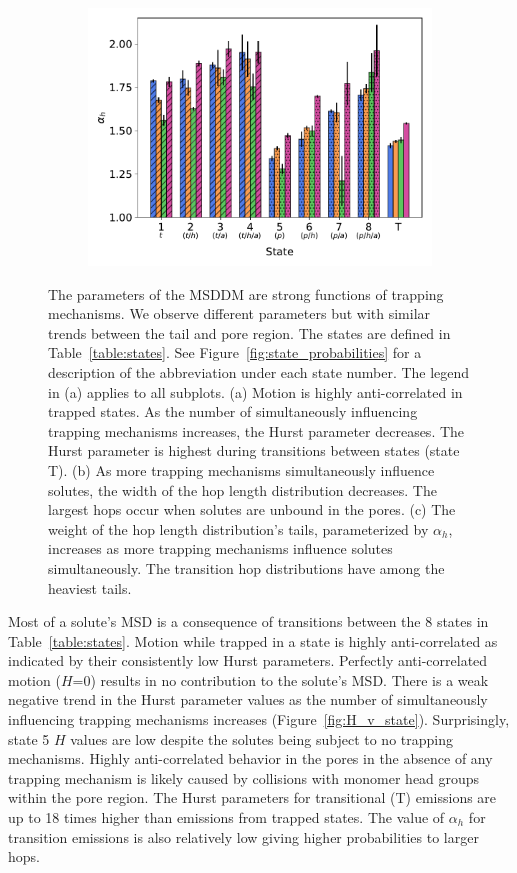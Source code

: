 \documentclass{article}
\begin{document}
\begin{figure}
\begin{subfigure}{0.325\textwidth}
  \includegraphics[width=\textwidth]{alpha_v_state.pdf}
  \caption{}\label{fig:alpha_v_state}
  \end{subfigure}
  \caption{The parameters of the MSDDM are strong functions of trapping mechanisms.
  We observe different parameters but with similar trends between the tail and pore
  region. The states are defined in Table~\ref{table:states}. See Figure~\ref{fig:state_probabilities}
  for a description of the abbreviation under each state number. The legend in (a) applies to all subplots. (a) Motion is
  highly anti-correlated in trapped states. As the number of simultaneously influencing
  trapping mechanisms increases, the Hurst parameter decreases. The Hurst parameter is
  highest during transitions between states (state T). (b) As more trapping mechanisms
  simultaneously influence solutes, the width of the hop length distribution decreases.
  The largest hops occur when solutes are unbound in the pores. (c) The weight of the 
  hop length distribution's tails, parameterized by $\alpha_h$, increases as more trapping
  mechanisms influence solutes simultaneously. The transition hop distributions have
  among the heaviest tails.}\label{fig:msddm_parameters}
  \end{figure}

  Most of a solute's MSD is a consequence of transitions between the 8 states
  in Table~\ref{table:states}. Motion while trapped in a state is highly 
  anti-correlated as indicated by their consistently low Hurst parameters.
  Perfectly anti-correlated motion ($H$=0) results in no contribution to the solute's
  MSD. There is a weak negative trend in the Hurst parameter values as the number
  of simultaneously influencing trapping mechanisms increases (Figure~\ref{fig:H_v_state}). 
  Surprisingly, state 5 $H$ values are low despite the solutes being subject to no
  trapping mechanisms. Highly anti-correlated behavior in the pores in the absence of
  any trapping mechanism is likely caused by collisions with monomer head groups 
  within the pore region. The Hurst parameters for transitional (T) emissions are up to 
  18 times higher than emissions from trapped states. The value of $\alpha_h$ for 
  transition emissions is also relatively low giving higher probabilities to larger hops.
  
\end{document}
